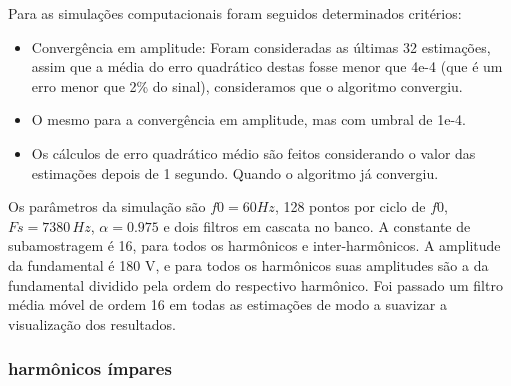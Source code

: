 \documentclass[a4paper, 12pt]{book}
\begin{document}
Para as simulações computacionais foram seguidos determinados critérios:

\begin{itemize}
	\item Convergência em amplitude: Foram consideradas as últimas 32 estimações, assim que a média do erro quadrático destas fosse menor que 4e-4 (que é um erro menor que 2\% do sinal), consideramos que o algoritmo convergiu.
	\item O mesmo para a convergência em amplitude, mas com umbral de 1e-4.
	\item Os cálculos de erro quadrático médio são feitos considerando o valor das estimações depois de 1 segundo. Quando o algoritmo já convergiu.
\end{itemize}

Os parâmetros da simulação são $f0=60Hz$, 128 pontos por ciclo de $f0$, $Fs=7380 \,Hz$, $\alpha=0.975$ e dois filtros em cascata no banco. A constante de subamostragem é 16, para todos os harmônicos e inter-harmônicos. A amplitude da fundamental é 180 V, e para todos os harmônicos suas amplitudes são a da fundamental dividido pela ordem do respectivo harmônico. Foi passado um filtro média móvel de ordem 16 em todas as estimações de modo a suavizar a visualização dos resultados.

\subsubsection{harmônicos ímpares}
\end{document}
